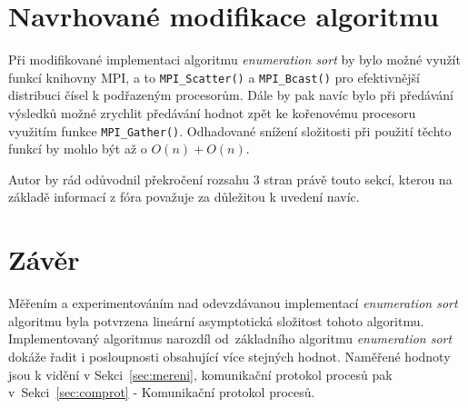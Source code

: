 \documentclass[a4paper,10pt]{article}
\newcommand{\Omicron}{O}
\begin{document}
    \section{Navrhované modifikace algoritmu}
    \label{sec:proposedmodifications}
    \par Při modifikované implementaci algoritmu \textit{enumeration sort} by bylo možné využít funkcí knihovny MPI, a to  \texttt{MPI\_Scatter()} a \texttt{MPI\_Bcast()} pro efektivnější distribuci čísel k podřazeným procesorům. Dále by pak navíc bylo při předávání výsledků možné zrychlit předávání hodnot zpět ke kořenovému procesoru využitím funkce \texttt{MPI\_Gather()}. Odhadované snížení složitosti při použití těchto funkcí by mohlo být až o $\Omicron\left(n\right) + \Omicron\left(n\right)$.
    \par Autor by rád odůvodnil překročení rozsahu 3 stran právě touto sekcí, kterou na základě informací z fóra považuje za důležitou k uvedení navíc.

	\section{Závěr}
	\label{sec:terminus}
    	\par Měřením a experimentováním nad odevzdávanou implementací \textit{enumeration sort} algoritmu byla potvrzena lineární asymptotická složitost tohoto algoritmu. Implementovaný algoritmus narozdíl od~základního algoritmu \textit{enumeration sort} dokáže řadit i posloupnosti obsahující více stejných hodnot. Naměřené hodnoty jsou k vidění v Sekci~\ref{sec:mereni}, komunikační protokol procesů pak v~Sekci~\ref{sec:comprot} \-- Komunikační protokol procesů. 
\end{document}

